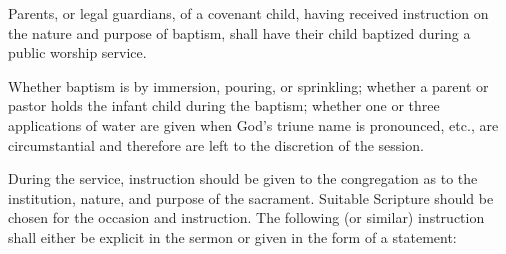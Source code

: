 \begin{outerlst}[left=0pt,labelsep=0pt]
\begin{innerlst}[resume*]
      \item Parents, or legal guardians, of a covenant child, having received instruction on the nature and purpose of baptism, shall have their child baptized during a public worship service.  
      \item Whether baptism is by immersion, pouring, or sprinkling; whether a parent or pastor holds the infant child during the baptism; whether one or three applications of water are given when God's triune name is pronounced, etc., are circumstantial and therefore are left to the discretion of the session. 
      \item During the service, instruction should be given to the congregation as to the institution, nature, and purpose of the sacrament. Suitable Scripture should be chosen for the occasion and instruction. The following (or similar) instruction shall either be explicit in the sermon or given in the form of a statement: 
\end{innerlst}

\end{outerlst}
